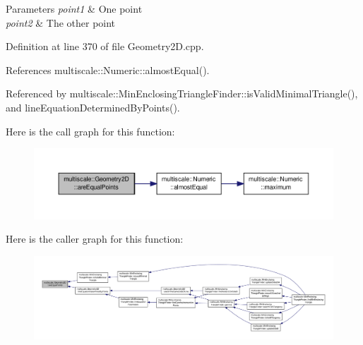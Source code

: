 \begin{DoxyParams}{Parameters}
{\em point1} & One point \\
\hline
{\em point2} & The other point \\
\hline
\end{DoxyParams}


Definition at line 370 of file Geometry2\-D.\-cpp.



References multiscale\-::\-Numeric\-::almost\-Equal().



Referenced by multiscale\-::\-Min\-Enclosing\-Triangle\-Finder\-::is\-Valid\-Minimal\-Triangle(), and line\-Equation\-Determined\-By\-Points().



Here is the call graph for this function\-:\nopagebreak
\begin{figure}[H]
\begin{center}
\leavevmode
\includegraphics[width=350pt]{classmultiscale_1_1Geometry2D_aa2d3ac595072b9ab61879a44629d7969_cgraph}
\end{center}
\end{figure}




Here is the caller graph for this function\-:\nopagebreak
\begin{figure}[H]
\begin{center}
\leavevmode
\includegraphics[width=350pt]{classmultiscale_1_1Geometry2D_aa2d3ac595072b9ab61879a44629d7969_icgraph}
\end{center}
\end{figure}


